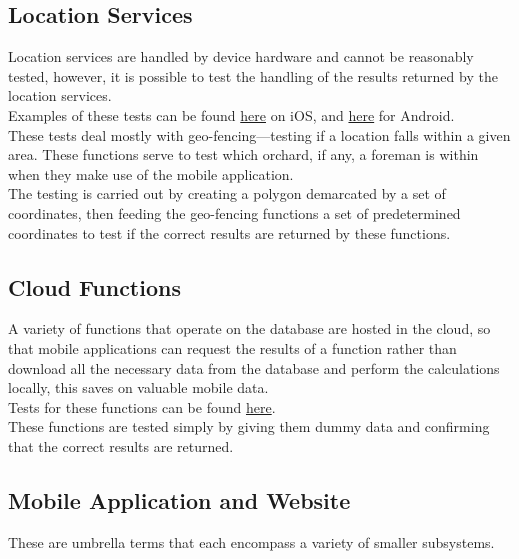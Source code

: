 \documentclass[12pt]{article}
\begin{document}
\subsection{Location Services}
Location services are handled by device hardware and cannot be reasonably tested, however, it is possible to test the handling of the results returned by the location services.\\
\indent Examples of these tests can be found \href{https://github.com/BinaryNinjaz/COS301-Capstone/blob/master/Source/iOS/Harvest/HarvestTests/GeoKitTests.swift}{here} on iOS, and \href{https://github.com/BinaryNinjaz/COS301-Capstone/blob/master/Source/Android/Harvest/app/src/test/java/za/org/samac/harvest/PolygonContainsPointTest.java}{here} for Android.\\
\indent These tests deal mostly with geo-fencing---testing if a location falls within a given area. These functions serve to test which orchard, if any, a foreman is within when they make use of the mobile application.\\
\indent The testing is carried out by creating a polygon demarcated by a set of coordinates, then feeding the geo-fencing functions a set of predetermined coordinates to test if the correct results are returned by these functions.
\subsection{Cloud Functions}
A variety of functions that operate on the database are hosted in the cloud, so that mobile applications can request the results of a function rather than download all the necessary data from the database and perform the calculations locally, this saves on valuable mobile data.\\
\indent Tests for these functions can be found \href{https://github.com/BinaryNinjaz/COS301-Capstone/blob/master/Source/Web/functions/test.js}{here}.\\
\indent These functions are tested simply by giving them dummy data and confirming that the correct results are returned.
\subsection{Mobile Application and Website}
These are umbrella terms that each encompass a variety of smaller subsystems.
\end{document}
